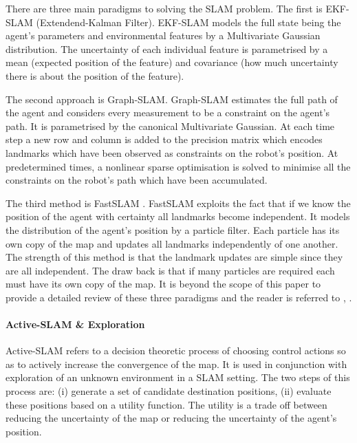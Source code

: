 \documentclass[review]{elsarticle}
\numberwithin{equation}{section}
\begin{document}

There are three main paradigms to solving the SLAM problem. The first is EKF-SLAM (Extendend-Kalman Filter)\cite{SLAM_part1}.
EKF-SLAM models the full state being the agent's parameters and environmental features by a Multivariate Gaussian distribution. 
The uncertainty of each individual feature is parametrised by a mean (expected position of the feature) and covariance 
(how much uncertainty there is about the position of the feature).

The second approach is Graph-SLAM\cite{TutGraphSLAM}. Graph-SLAM estimates the full path of the agent and considers every measurement to 
be a constraint on the agent's path. It is parametrised by the canonical Multivariate Gaussian. At each time step a new row and column 
is added to the precision matrix which encodes landmarks which have been observed as constraints on the robot's position.
At predetermined times, a nonlinear sparse optimisation is solved to minimise all the constraints on the robot's path which have been accumulated.

The third method is FastSLAM \cite{FastSLAM}. FastSLAM exploits the fact that if we know the position of the agent with 
certainty all landmarks become independent. It models the distribution of the agent's position by a particle filter. Each particle
has its own copy of the map and updates all landmarks independently of one another. The strength of this method is that the landmark
updates are simple since they are all independent. The draw back is that if many particles are required each must have its own copy of the map. 
It is beyond the scope of this paper to provide a detailed review of these  three paradigms and the reader is referred to \cite{Thrun_Burgard_Fox_2005}, \cite{SLAM_HBR}.

\paragraph*{Active-SLAM \& Exploration}

Active-SLAM refers to a decision theoretic process of choosing control actions so as to actively 
increase the convergence of the map. It is used in conjunction with exploration of an unknown environment
in a SLAM setting. The two steps of this process are: (i) generate a set of 
candidate destination positions, (ii) evaluate these positions based on a utility function. The utility  
is a trade off between reducing the uncertainty of the map or reducing the uncertainty
of the agent's position.
\end{document}
